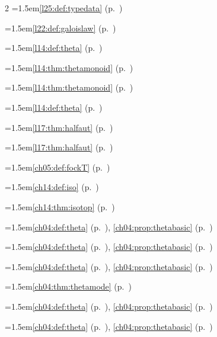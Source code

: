 \begin{multicols}{2}
\hangindent=1.5em\quad \ref{l25:def:typedata} (p.~\pageref{l25:def:typedata})\par
\hangindent=1.5em\quad \ref{l22:def:galoislaw} (p.~\pageref{l22:def:galoislaw})\par
\hangindent=1.5em\quad \ref{l14:def:theta} (p.~\pageref{l14:def:theta})\par
\hangindent=1.5em\quad \ref{l14:thm:thetamonoid} (p.~\pageref{l14:thm:thetamonoid})\par
\hangindent=1.5em\quad \ref{l14:thm:thetamonoid} (p.~\pageref{l14:thm:thetamonoid})\par
\hangindent=1.5em\quad \ref{l14:def:theta} (p.~\pageref{l14:def:theta})\par
\hangindent=1.5em\quad \ref{l17:thm:halfaut} (p.~\pageref{l17:thm:halfaut})\par
\hangindent=1.5em\quad \ref{l17:thm:halfaut} (p.~\pageref{l17:thm:halfaut})\par
\hangindent=1.5em\quad \ref{ch05:def:fockT} (p.~\pageref{ch05:def:fockT})\par
\hangindent=1.5em\quad \ref{ch14:def:iso} (p.~\pageref{ch14:def:iso})\par
\hangindent=1.5em\quad \ref{ch14:thm:isotop} (p.~\pageref{ch14:thm:isotop})\par
\hangindent=1.5em\quad \ref{ch04:def:theta} (p.~\pageref{ch04:def:theta}), \ref{ch04:prop:thetabasic} (p.~\pageref{ch04:prop:thetabasic})\par
\hangindent=1.5em\quad \ref{ch04:def:theta} (p.~\pageref{ch04:def:theta}), \ref{ch04:prop:thetabasic} (p.~\pageref{ch04:prop:thetabasic})\par
\hangindent=1.5em\quad \ref{ch04:def:theta} (p.~\pageref{ch04:def:theta}), \ref{ch04:prop:thetabasic} (p.~\pageref{ch04:prop:thetabasic})\par
\hangindent=1.5em\quad \ref{ch04:thm:thetamode} (p.~\pageref{ch04:thm:thetamode})\par
\hangindent=1.5em\quad \ref{ch04:def:theta} (p.~\pageref{ch04:def:theta}), \ref{ch04:prop:thetabasic} (p.~\pageref{ch04:prop:thetabasic})\par
\hangindent=1.5em\quad \ref{ch04:def:theta} (p.~\pageref{ch04:def:theta}), \ref{ch04:prop:thetabasic} (p.~\pageref{ch04:prop:thetabasic})\par

\end{multicols}
